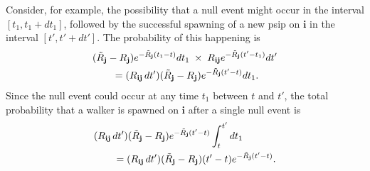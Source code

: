 \documentclass[a4paper, 11pt]{article}
\newcommand{\bi}{\mathbf{i}}
\newcommand{\bj}{\mathbf{j}}
\begin{document}
Consider, for example, the possibility that a null event might occur in
the interval $[t_1,t_1+dt_1]$, followed by the successful spawning of a
new psip on $\bi$ in the interval $[t',t'+dt']$. The probability of this
happening is
\begin{align*}
  \MoveEqLeft 
  ( \tilde{R}_{\bj} - R_{\bj} ) e^{-\tilde{R}_{\bj}(t_1 -
    t)} dt_1 \; \times \;
    R_{\bi\bj} e^{-\tilde{R}_{\bj}(t' - t_1)} dt' \\
    & = 
    ( R_{\bi\bj} \, dt' ) ( 
      \tilde{R}_{\bj} - R_{\bj} ) e^{-\tilde{R}_{\bj}(t'-t)} dt_1.
\end{align*}
Since the null event could occur at any time $t_1$ between $t$ and $t'$,
the total probability that a walker is spawned on $\bi$ after a single
null event is
\begin{align*}
\MoveEqLeft ( R_{\bi\bj} \, dt' ) 
( \tilde{R}_{\bj} - R_{\bj} ) e^{-\tilde{R}_{\bj}(t'-t)}
\int_{t}^{t'} dt_1 \\
& = ( R_{\bi\bj} \, dt' )
( \tilde{R}_{\bj} - R_{\bj} ) ( t'-t )
 e^{-\tilde{R}_{\bj}(t'-t)} .
\end{align*}
\end{document}

